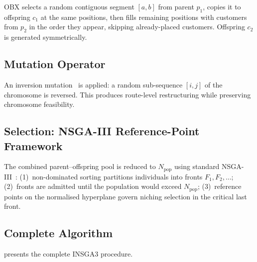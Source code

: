 \documentclass[11pt, a4paper]{article}
\numberwithin{equation}{section}
\begin{document}
OBX selects a random contiguous segment $[a,b]$ from parent $p_1$, copies it
to offspring $c_1$ at the same positions, then fills remaining positions with
customers from $p_2$ in the order they appear, skipping already-placed
customers.  Offspring $c_2$ is generated symmetrically.

\subsection{Mutation Operator}

An inversion mutation~\cite{larranaga1999} is applied: a random sub-sequence
$[i,j]$ of the chromosome is reversed.  This produces route-level
restructuring while preserving chromosome feasibility.

\subsection{Selection: NSGA-III Reference-Point Framework}

The combined parent--offspring pool is reduced to $N_{\mathrm{pop}}$ using
standard NSGA-III~\cite{deb2014nsga3}: (1)~non-dominated sorting partitions
individuals into fronts $F_1,F_2,\ldots$; (2)~fronts are admitted until the
population would exceed $N_{\mathrm{pop}}$; (3)~reference points on the
normalised hyperplane govern niching selection in the critical last front.

\subsection{Complete Algorithm}

 presents the complete INSGA3 procedure.
\end{document}

